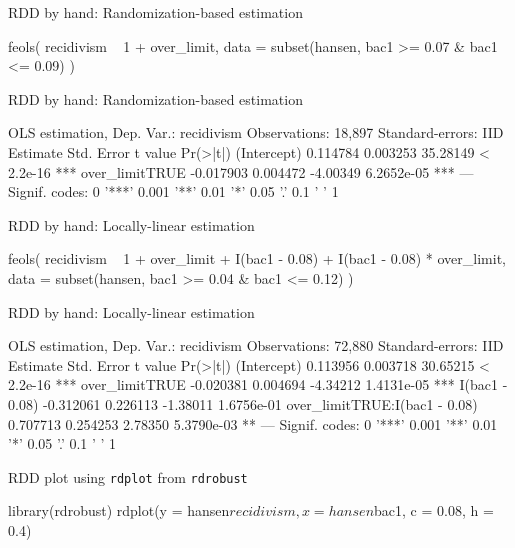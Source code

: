 \documentclass[aspectratio=169,t,11pt,table]{beamer}
\begin{document}

\begin{frame}[fragile]{RDD by hand: Randomization-based estimation}
	\begin{codeblock}
feols(
  recidivism ~ 1 + over_limit,
  data = subset(hansen, bac1 >= 0.07 & bac1 <= 0.09)
)
	\end{codeblock}
\end{frame}

\begin{frame}[fragile]{RDD by hand: Randomization-based estimation}
  \begin{codeblock}[{}]
OLS estimation, Dep. Var.: recidivism
Observations: 18,897
Standard-errors: IID 
                Estimate Std. Error  t value   Pr(>|t|)    
(Intercept)     0.114784   0.003253 35.28149  < 2.2e-16 ***
over_limitTRUE -0.017903   0.004472 -4.00349 6.2652e-05 ***
---
Signif. codes:  0 '***' 0.001 '**' 0.01 '*' 0.05 '.' 0.1 ' ' 1
  \end{codeblock}
\end{frame}

\begin{frame}[fragile]{RDD by hand: Locally-linear estimation}
  \vspace{-\bigskipamount}
	\begin{codeblock}
feols(
  recidivism ~ 1 + over_limit + 
    I(bac1 - 0.08) + I(bac1 - 0.08) * over_limit,
  data = subset(hansen, bac1 >= 0.04 & bac1 <= 0.12)
)
	\end{codeblock}
\end{frame}

\begin{frame}[fragile]{RDD by hand: Locally-linear estimation}
  \begin{codeblock}[{}]
OLS estimation, Dep. Var.: recidivism
Observations: 72,880
Standard-errors: IID 
                                Estimate Std. Error  t value   Pr(>|t|)    
(Intercept)                    0.113956   0.003718 30.65215  < 2.2e-16 ***
over_limitTRUE                -0.020381   0.004694 -4.34212 1.4131e-05 ***
I(bac1 - 0.08)                -0.312061   0.226113 -1.38011 1.6756e-01    
over_limitTRUE:I(bac1 - 0.08)  0.707713   0.254253  2.78350 5.3790e-03 ** 
---
Signif. codes:  0 '***' 0.001 '**' 0.01 '*' 0.05 '.' 0.1 ' ' 1
  \end{codeblock}
\end{frame}

\begin{frame}[fragile]{RDD plot using \texttt{rdplot} from \texttt{rdrobust}}{}
	\begin{codeblock}
library(rdrobust)
rdplot(y = hansen$recidivism, x = hansen$bac1, c = 0.08, h = 0.4)
	\end{codeblock}
\end{frame}
\end{document}
